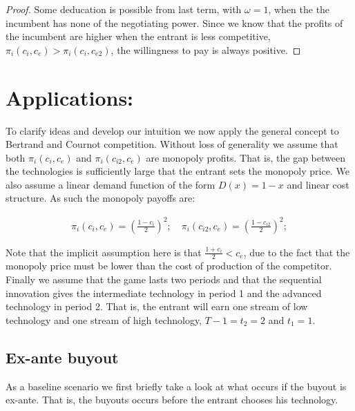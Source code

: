 \begin{proof}
Some deducation is possible from last term, with $\omega = 1$, when the the incumbent has none of the negotiating power. Since we know that the profits of the incumbent are higher when the entrant is less competitive, $\pi_i(c_i,c_e)>\pi_i(c_{i},c_{e2})$, the willingness to pay is always positive. 
\end{proof}

\section{Applications:}\label{application}

To clarify ideas and develop our intuition we now apply the general concept to Bertrand and Cournot competition. Without loss of generality we assume that both $\pi_i(c_i,c_e)$ and
$\pi_i(c_{i2},c_e)$ are monopoly profits. That is, the gap between the technologies is sufficiently large that the entrant sets the monopoly price. We also assume a linear demand function of the form $D(x)=1-x$ and linear cost structure.  As such the monopoly payoffs are: 

\begin{align*}
\pi_i(c_i,c_e) = 
\left(\frac{1-c_i}{2}\right)^2; \quad \pi_i(c_{i2},c_e) = \left(\frac{1-c_{i2}}{2}\right)^2;  
\end{align*}

Note that the implicit assumption here is that $\frac{1+c_i}{2}<c_e$, due to the fact that the monopoly price must be lower than the cost of production of the competitor. Finally we assume that the game lasts two periods and that the sequential innovation gives the intermediate technology in period 1 and the advanced technology in period 2. That is, the entrant will earn one stream of low technology and one stream of high technology, $T-1=t_2=2$ and $t_1=1$.

\subsection{Ex-ante buyout}

As a baseline scenario we first briefly take a look at what occurs if the buyout is ex-ante. That is, the buyouts occurs before the entrant chooses his technology. 

